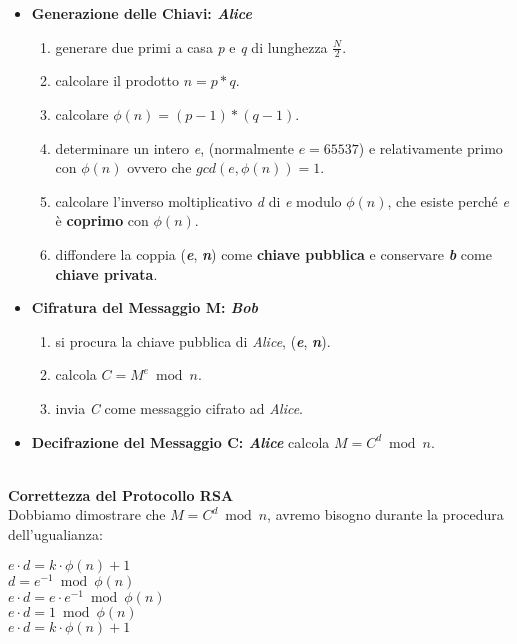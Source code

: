 \begin{itemize}
    \item \textbf{Generazione delle Chiavi: \textit{Alice}}
    \begin{enumerate}
        \item generare due primi a casa \textit{p} e \textit{q} di lunghezza $\frac{N}{2}$.
        \item calcolare il prodotto $n = p * q$.
        \item calcolare $\phi(n) = (p - 1) * (q - 1)$.
        \item determinare un intero \textit{e}, (normalmente $e = 65537$) e relativamente primo con $\phi(n)$ ovvero che $gcd(e, \phi(n)) = 1$.
        \item calcolare l'inverso moltiplicativo \textit{d} di \textit{e} modulo $\phi(n)$, che esiste perché \textit{e} è \textbf{coprimo} con $\phi(n)$.
        \item diffondere la coppia (\textbf{\textit{e}}, \textbf{\textit{n}}) come \textbf{chiave pubblica} e conservare \textbf{\textit{b}} come \textbf{chiave privata}.
    \end{enumerate}
    \item \textbf{Cifratura del Messaggio M: \textit{Bob}}
    \begin{enumerate}
        \item si procura la chiave pubblica di \textit{Alice}, (\textbf{\textit{e}}, \textbf{\textit{n}}).
        \item calcola $C = M^e \bmod n$.
        \item invia \textit{C} come messaggio cifrato ad \textit{Alice}.
    \end{enumerate}
    \item \textbf{Decifrazione del Messaggio C: \textit{Alice}} calcola $M = C^d \bmod n$.
\end{itemize}
\   \\
\textbf{Correttezza del Protocollo RSA} \\
Dobbiamo dimostrare che $M = C^d \bmod n$, avremo bisogno durante la procedura dell'ugualianza: 
\begin{center}
    $e \cdot d = k \cdot \phi(n) + 1$ \\
    $d = e^{-1} \bmod \phi(n)$ \\
    $e \cdot d = e \cdot e^{-1} \bmod \phi(n)$ \\
    $e \cdot d = 1 \bmod \phi(n)$ \\
    $e \cdot d = k \cdot \phi(n) + 1$ \\
\end{center}
